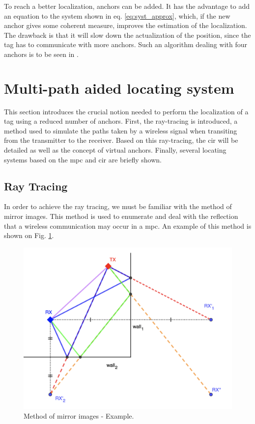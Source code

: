 To reach a better localization, anchors can be added. It has the advantage to add an equation to the system shown in eq. \ref{eq:syst_approx}, which, if the new anchor gives some coherent measure, improves the estimation of the localization. The drawback is that it will slow down the actualization of the position, since the tag has to communicate with more anchors. Such an algorithm dealing with four anchors is to be seen in \cite{guyard2019navigation}.

\section{Multi-path aided locating system}
\label{mpls}

This section introduces the crucial notion needed to perform the localization of a tag using a reduced number of anchors. First, the ray-tracing is introduced, a method used to simulate the paths taken by a wireless signal when transiting from the transmitter to the receiver. Based on this ray-tracing, the \gls{cir} will be detailed as well as the concept of virtual anchors. Finally, several locating systems based on the \gls{mpc} and \gls{cir} are briefly shown. 

\subsection{Ray Tracing}
\label{ray_tracing}

In order to achieve the ray tracing, we must be familiar with the method of mirror images. This method is used to enumerate and deal with the reflection that a wireless communication may occur in a \gls{mpc}. An example of this method is shown on Fig. \ref{fig:image_method}. 

\begin{figure}[H]
\centering
\includegraphics[width=.7\linewidth]{Images/mirror_image.png}
\caption{Method of mirror images - Example. \label{fig:image_method}}
\end{figure}

